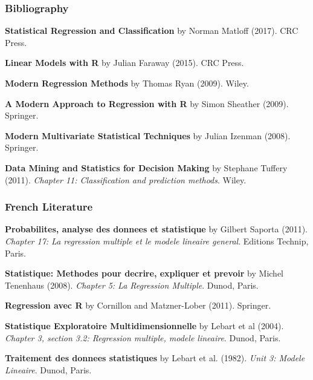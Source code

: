 \documentclass[12pt]{beamer}\usepackage[]{graphicx}\usepackage[]{color}
\begin{document}

\begin{frame}
\frametitle{Bibliography}

{\footnotesize
\bi
  \item \textbf{Statistical Regression and Classification} by Norman Matloff (2017). CRC Press.
  \item \textbf{Linear Models with R} by Julian Faraway (2015). CRC Press.
  \item \textbf{Modern Regression Methods} by Thomas Ryan (2009). Wiley.
  \item \textbf{A Modern Approach to Regression with R} by Simon Sheather (2009). Springer.
  \item \textbf{Modern Multivariate Statistical Techniques} by Julian Izenman (2008). Springer.
  \item \textbf{Data Mining and Statistics for Decision Making} by Stephane Tuffery (2011).
  \textit{Chapter 11: Classification and prediction methods}. Wiley.
\ei
}

\end{frame}


\begin{frame}
\frametitle{French Literature}

{\footnotesize
\bi
  \item \textbf{Probabilites, analyse des donnees et statistique} by Gilbert Saporta (2011).
  \textit{Chapter 17: La regression multiple et le modele lineaire general}. 
  Editions Technip, Paris.
  \item \textbf{Statistique: Methodes pour decrire, expliquer et prevoir} 
  by Michel Tenenhaus (2008). \textit{Chapter 5: La Regression Multiple}. Dunod, Paris.
  \item \textbf{Regression avec R} by Cornillon and Matzner-Lober (2011). Springer.
  \item \textbf{Statistique Exploratoire Multidimensionnelle} by Lebart et al (2004).
  \textit{Chapter 3, section 3.2: Regression multiple, modele lineaire}. Dunod, Paris.
  \item \textbf{Traitement des donnees statistiques} by Lebart et al. (1982). 
  \textit{Unit 3: Modele Lineaire}. Dunod, Paris.
\ei
}

\end{frame}

\end{document}

